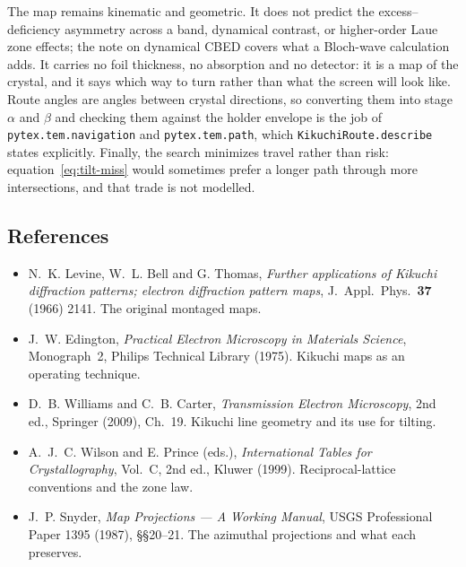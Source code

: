The map remains kinematic and geometric. It does not predict the
excess--deficiency asymmetry across a band, dynamical contrast, or higher-order
Laue zone effects; the note on dynamical CBED covers what a Bloch-wave calculation
adds. It carries no foil thickness, no absorption and no detector: it is a map of
the crystal, and it says which way to turn rather than what the screen will look
like. Route angles are angles between crystal directions, so converting them into
stage $\alpha$ and $\beta$ and checking them against the holder envelope is the
job of \texttt{pytex.tem.navigation} and \texttt{pytex.tem.path}, which
\texttt{KikuchiRoute.describe} states explicitly. Finally, the search minimizes
travel rather than risk: equation~\eqref{eq:tilt-miss} would sometimes prefer a
longer path through more intersections, and that trade is not modelled.

\subsection{References}

\begin{itemize}
  \item N.~K. Levine, W.~L. Bell and G. Thomas, \emph{Further applications of
        Kikuchi diffraction patterns; electron diffraction pattern maps},
        J.~Appl.~Phys.\ \textbf{37} (1966) 2141. The original montaged maps.
  \item J.~W. Edington, \emph{Practical Electron Microscopy in Materials
        Science}, Monograph~2, Philips Technical Library (1975). Kikuchi maps as
        an operating technique.
  \item D.~B. Williams and C.~B. Carter, \emph{Transmission Electron
        Microscopy}, 2nd ed., Springer (2009), Ch.~19. Kikuchi line geometry and
        its use for tilting.
  \item A.~J.~C. Wilson and E. Prince (eds.), \emph{International Tables for
        Crystallography}, Vol.~C, 2nd ed., Kluwer (1999). Reciprocal-lattice
        conventions and the zone law.
  \item J.~P. Snyder, \emph{Map Projections --- A Working Manual}, USGS
        Professional Paper 1395 (1987), \S\S20--21. The azimuthal projections and
        what each preserves.
\end{itemize}

